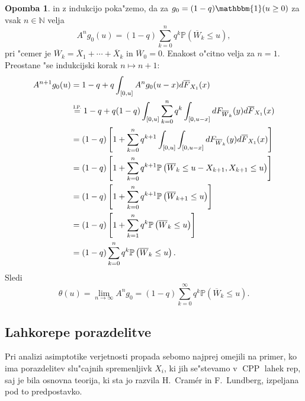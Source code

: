 \documentclass[12pt, a4paper, reqno]{amsart}
\theoremstyle{definition}
\newtheorem{opomba}[definicija]{Opomba}
\theoremstyle{plain}
\newcommand{\N}{\mathbb{N}}
\newcommand{\Prob}{\mathbb{P}}
\newcommand{\1}{\mathds{1}}
\DeclareMathOperator{\CPP}{CPP}
\begin{document}
\begin{opomba}
    in z indukcijo poka"zemo, da za $g_0 = (1 - q)\mathbbm{1}(u\geq0)$ za vsak $n\in\N$ velja
    \begin{equation*}
        A^ng_0(u) = (1 - q)\sum_{k = 0}^nq^k\Prob\left(\overline{W}_k \leq u\right),
    \end{equation*}
    pri "cemer je $\overline{W}_k = \overline{X}_1 + \cdots + \overline{X}_k$ in $\overline{W}_0 = 0$.
    Enakost o"citno velja za $n=1$. Preostane "se indukcijski korak $n\mapsto n+1:$
    \begin{align*}
        A^{n+1}g_0(u) 
            &= 1 - q + q\int_{[0, u]}A^ng_0(u - x)d\overline{F}_{X_1}(x) \\
            &\stackrel{\text{\scalebox{0.8}{I.P.}}}{=} 1 - q + q(1 - q)\int_{[0, u]}\sum_{k = 0}^nq^k\int_{[0, u-x]}dF_{\overline{W}_k}(y)d\overline{F}_{X_1}(x) \\
            &=  (1 - q)\left[1 + \sum_{k=0}^nq^{k+1}\int_{[0, u]}\int_{[0, u-x]}dF_{\overline{W}_k}(y)d\overline{F}_{X_1}(x)\right] \\
            &= (1 - q)\left[1 + \sum_{k=0}^nq^{k+1}\Prob\left(\overline{W}_k \leq u - X_{k+1}, X_{k+1}\leq u\right)\right] \\
            &= (1 - q)\left[1 + \sum_{k=0}^nq^{k+1}\Prob\left(\overline{W}_{k+1}\leq u\right)\right] \\
            &= (1 - q)\left[1 + \sum_{k=1}^nq^k\Prob\left(\overline{W}_k\leq u\right)\right] \\
            &= (1 - q)\sum_{k=0}^nq^k\Prob\left(\overline{W}_k\leq u\right).
    \end{align*}
    Sledi 
    \begin{equation}
        \theta(u) = \lim_{n\to\infty} A^ng_0 = (1 - q)\sum_{k = 0}^\infty q^k\Prob\left(\overline{W}_k \leq u\right).
        \label{eq:bodocaGeometrijska}
    \end{equation}
    \label{op:OperatorPrenovitvena}
    \end{opomba}

    
    \subsection{Lahkorepe porazdelitve}
        Pri analizi asimptotike verjetnosti propada se\newline bomo najprej omejili na primer, ko ima 
        porazdelitev slu"cajnih spremenljivk $X_i$, ki jih 
        se"stevamo v $\CPP$ lahek rep, saj je bila osnovna teorija, ki sta jo razvila H.\ Cramér in F.\ Lundberg,
        izpeljana pod to predpostavko.
\end{document}
